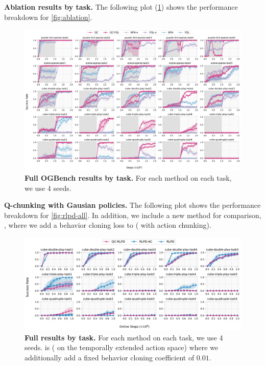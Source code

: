 \textbf{Ablation results by task.} The following plot (\cref{fig:ablation-all-individual}) shows the performance breakdown for \cref{fig:ablation}.
\begin{figure}[H]
    \centering
\includegraphics[width=\linewidth]{figures/main-all-individual.pdf} %
    \caption{\textbf{Full OGBench results by task.} For each method on each task, we use 4 seeds.}
    \label{fig:ablation-all-individual}
\end{figure}


\textbf{Q-chunking with Gausian policies.}
The following plot shows the performance breakdown for \cref{fig:rlpd-all}. In addition, we include a new method for comparison, , where we add a behavior cloning loss to  ( with action chunking).
\begin{figure}[H]
    \centering
\includegraphics[width=\linewidth]{figures/rlpd-qc-all-individual.pdf} %
    \caption{\textbf{Full  results by task.} For each method on each task, we use 4 seeds.  is  ( on the temporally extended action space) where we additionally add a fixed behavior cloning coefficient of $0.01$.}
    \label{fig:rlpd-all-ind}
\end{figure}

